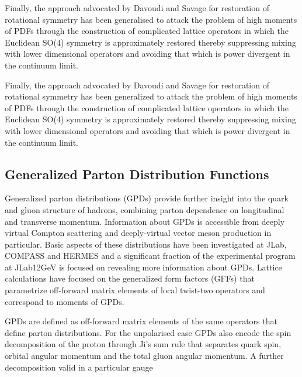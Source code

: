 Finally, the approach advocated by Davoudi and Savage \cite{Davoudi:2012ya} for restoration of rotational symmetry has been generalised to attack the 
problem of high moments of PDFs through the construction of complicated lattice operators in which the Euclidean SO(4) symmetry is approximately restored thereby suppressing mixing with lower dimensional operators and avoiding that which is power divergent in the continuum limit. 

Finally, the approach advocated by Davoudi and Savage for restoration of rotational symmetry has been generalized to attack the 
problem of high moments of PDFs through the construction of complicated lattice operators in which the Euclidean SO(4) symmetry is approximately restored thereby suppressing mixing with lower dimensional operators and avoiding that which is power divergent in the continuum limit.


\subsection{Generalized Parton Distribution Functions}

%	

Generalized parton distributions (GPDs) \cite{Ji:2001wha,Radyushkin:1997ki,Diehl:2003ny,Belitsky:2005qn} provide further insight into the quark and gluon structure of hadrons, combining parton dependence on longitudinal and transverse momentum. Information about GPDs is accessible from deeply virtual Compton scattering and deeply-virtual vector meson production in particular. Basic aspects of these distributions have been investigated at JLab, COMPASS and HERMES and a significant fraction of the experimental program at JLab12GeV is focused on revealing more  information about  GPDs. Lattice calculations have focused on the generalized form factors (GFFs) that parametrize off-forward matrix elements of local twist-two operators and correspond to moments of GPDs. 

GPDs are defined as  off-forward matrix elements of the same operators that define parton distributions. For the unpolarised case
GPDs also encode the spin decomposition of the proton through Ji's sum rule \cite{Ji:1996ek} that separates quark spin, orbital angular momentum and the total gluon angular momentum. A further decomposition valid in a particular gauge

